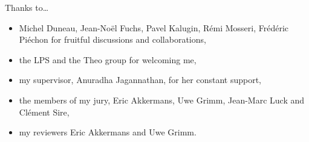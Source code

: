 \begin{frame}{Thanks to\dots}
\begin{itemize}
	\item Michel Duneau, Jean-Noël Fuchs, Pavel Kalugin, Rémi Mosseri, Frédéric Piéchon for fruitful discussions and collaborations,
	\item the LPS and the Theo group for welcoming me,
	\item my supervisor, Anuradha Jagannathan, for her constant support,
	\item the members of my jury, Eric Akkermans, Uwe Grimm, Jean-Marc Luck and Clément Sire,
	\item my reviewers Eric Akkermans and Uwe Grimm.
\end{itemize}


\end{frame}
